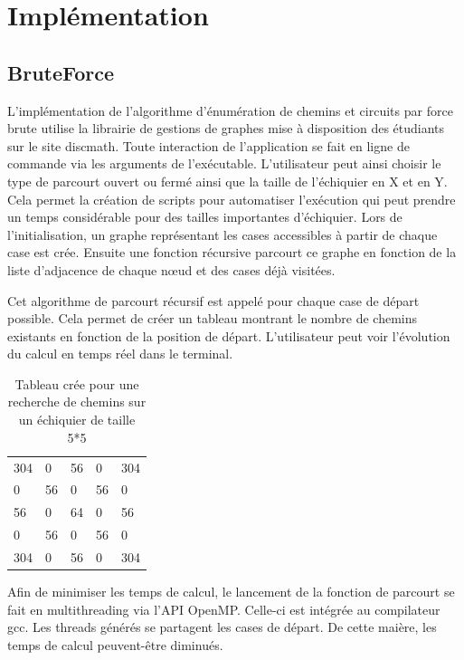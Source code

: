 \section{Implémentation}
\subsection{BruteForce}
L'implémentation de l’algorithme d’énumération de chemins et circuits par force brute utilise la librairie de gestions de graphes mise à disposition des étudiants sur le site discmath. Toute interaction de l’application se fait en ligne de commande via les arguments de l’exécutable. L’utilisateur peut ainsi choisir le type de parcourt ouvert ou fermé ainsi que la taille de l’échiquier en X et en Y.  Cela permet la création de scripts pour automatiser l’exécution qui peut prendre un temps considérable pour des tailles importantes d’échiquier.
Lors de l’initialisation, un graphe représentant les cases accessibles à partir de chaque case est crée. Ensuite une fonction récursive parcourt ce graphe en fonction de la liste d’adjacence de chaque nœud et des cases déjà visitées.

Cet algorithme de parcourt récursif est appelé pour chaque case de départ possible. Cela permet de créer un tableau montrant le nombre de chemins existants en fonction de la position de départ. L’utilisateur peut voir l’évolution du calcul en temps réel dans le terminal.
\begin{table}[H]
\centering
\caption{Tableau crée pour une recherche de chemins sur un échiquier de taille 5*5}
\label{my-label}
\begin{tabular}{lllll}
304 & 0  & 56 & 0  & 304 \\
0   & 56 & 0  & 56 & 0   \\
56  & 0  & 64 & 0  & 56  \\
0   & 56 & 0  & 56 & 0   \\
304 & 0  & 56 & 0  & 304
\end{tabular}
\end{table}

Afin de minimiser les temps de calcul, le lancement de la fonction de parcourt se fait en multithreading via l'API OpenMP. Celle-ci est intégrée au compilateur gcc. Les threads générés se partagent les cases de départ. De cette maière, les temps de calcul peuvent-être diminués.
